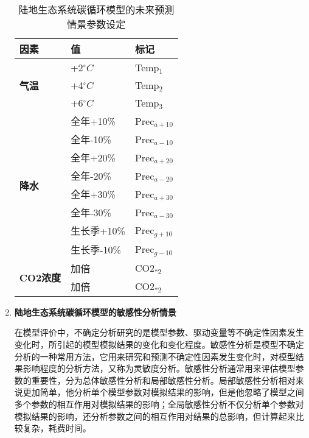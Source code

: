 \begin{enumerate}[(1)]
\begin{table}[!htbp]
    \centering
    \caption{陆地生态系统碳循环模型的未来预测情景参数设定}
    \label{tab:future-scene}
    \begin{threeparttable}
        \begin{tabular}{l|l|l}
            \toprule[1.5pt]
            {\textbf{因素}} & {\textbf{值}} & {\textbf{标记}} \\
            \midrule[1.5pt]
            \multirow{3}{*}{\textbf{气温}} & +2$^{\circ}C$ & Temp$_{1}$ \\
            & +4$^{\circ}C$ & Temp$_{2}$ \\
            & +6$^{\circ}C$ & Temp$_{3}$ \\
            \hline
            \multirow{8}{*}{\textbf{降水}} & 全年+10\% & Prec$_{a+10}$ \\
            & 全年-10\% & Prec$_{a-10}$ \\
            & 全年+20\% & Prec$_{a+20}$ \\
            & 全年-20\% & Prec$_{a-20}$ \\
            & 全年+30\% & Prec$_{a+30}$ \\
            & 全年-30\% & Prec$_{a-30}$ \\
            & 生长季+10\% & Prec$_{g+10}$ \\
            & 生长季-10\% & Prec$_{g-10}$ \\
            \hline
            \multirow{2}{*}{\textbf{CO2浓度}} & 加倍 & CO2$_{*2}$ \\
            & 加倍 & CO2$_{*2}$ \\
            \bottomrule[1.5pt]
        \end{tabular}
    \end{threeparttable}
\end{table}

\item \textbf{陆地生态系统碳循环模型的敏感性分析情景}

在模型评价中，不确定分析研究的是模型参数、驱动变量等不确定性因素发生变化时，所引起的模型模拟结果的变化和变化程度。敏感性分析是模型不确定分析的一种常用方法，它用来研究和预测不确定性因素发生变化时，对模型结果影响程度的分析方法，又称为灵敏度分析。敏感性分析通常用来评估模型参数的重要性，分为总体敏感性分析和局部敏感性分析。局部敏感性分析相对来说更加简单，他分析单个模型参数对模拟结果的影响，但是他忽略了模型之间多个参数的相互作用对模拟结果的影响；全局敏感性分析不仅分析单个参数对模拟结果的影响，还分析参数之间的相互作用对结果的总影响，但计算起来比较复杂，耗费时间。


\end{enumerate}
